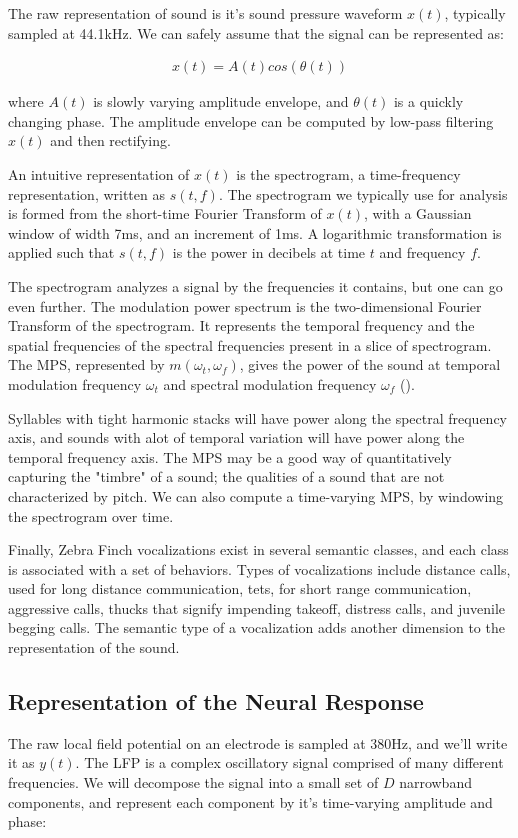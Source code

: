 \documentclass[12pt,article,oneside]{memoir}
\begin{document}
The raw representation of sound is it's sound pressure waveform $x(t)$, typically
sampled at 44.1kHz. We can safely assume that the signal can be represented as:

\begin{align}
x(t) = A(t)cos(\theta(t))
\end{align}

where $A(t)$ is slowly varying amplitude envelope, and $\theta(t)$ is a quickly changing phase.
The amplitude envelope can be computed by low-pass filtering $x(t)$ and then rectifying.

An intuitive representation of $x(t)$ is the spectrogram, a time-frequency representation,
written as $s(t, f)$. The spectrogram we typically use for analysis is formed from
the short-time Fourier Transform of $x(t)$, with a Gaussian window of width 7ms, and an
increment of 1ms. A logarithmic transformation is applied such that $s(t, f)$ is the power
in decibels at time $t$ and frequency $f$.

The spectrogram analyzes a signal by the frequencies it contains, but one can go even further.
The modulation power spectrum is the two-dimensional Fourier Transform of the spectrogram. It
represents the temporal frequency and the spatial frequencies of the spectral frequencies present
in a slice of spectrogram. The MPS, represented by $m(\omega_t, \omega_f)$, gives the power of
the sound at temporal modulation frequency $\omega_t$ and spectral modulation frequency $\omega_f$
(\cite{Singh2003}).

Syllables with tight harmonic stacks will have power along the spectral frequency axis, and
sounds with alot of temporal variation will have power along the temporal frequency axis.
The MPS may be a good way of quantitatively capturing the "timbre" of a sound; the qualities
of a sound that are not characterized by pitch. We can also compute a time-varying MPS, by
windowing the spectrogram over time.

Finally, Zebra Finch vocalizations exist in several semantic classes, and each class is
associated with a set of behaviors. Types of vocalizations include distance calls, used
for long distance communication, tets, for short range communication, aggressive calls,
thucks that signify impending takeoff, distress calls, and juvenile begging calls. The
semantic type of a vocalization adds another dimension to the representation of the sound.

\subsection{Representation of the Neural Response}
The raw local field potential on an electrode is sampled at 380Hz, and we'll write it
as $y(t)$. The LFP is a complex oscillatory signal comprised of many different frequencies.
We will decompose the signal into a small set of $D$ narrowband components, and represent
each component by it's time-varying amplitude and phase:
\end{document}
